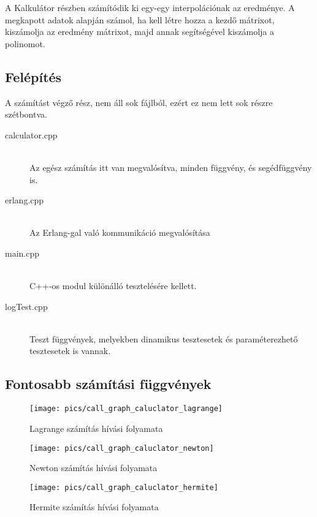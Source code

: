 A Kalkulátor részben számítódik ki egy-egy interpolációnak az eredménye.
A megkapott adatok alapján számol, ha kell létre hozza a kezdő mátrixot, kiszámolja az eredmény mátrixot, majd annak segítségével kiszámolja a polinomot. \newline

\subsection{Felépítés}
	A számítást végző rész, nem áll sok fájlból, ezért ez nem lett sok részre szétbontva. 
	\begin{description}
		\item[calculator.cpp] 
		\hfill \\ Az egész számítás itt van megvalósítva, minden függvény, és segédfüggvény is.
		\item[erlang.cpp] 
		\hfill \\ Az Erlang-gal való kommunikáció megvalósítása
		\item[main.cpp] 
		\hfill \\ C++-os modul különálló tesztelésére kellett.
		\item[logTest.cpp] 
		\hfill \\ 
		Teszt függvények, melyekben dinamikus tesztesetek és paraméterezhető tesztesetek is vannak.
	\end{description}
\subsection{Fontosabb számítási függvények}
	\begin{figure}[h]
		\texttt{[image: pics/call\_graph\_caluclator\_lagrange]}
		\centering
		\caption{Lagrange számítás hívási folyamata\label{fig:call_graph_caluclator_lagrange}}
	\end{figure}

	\begin{figure}[h]
		\texttt{[image: pics/call\_graph\_caluclator\_newton]}
		\centering
		\caption{Newton számítás hívási folyamata\label{fig:call_graph_caluclator_newton}}
	\end{figure}

	\begin{figure}[h]
		\texttt{[image: pics/call\_graph\_caluclator\_hermite]}
		\centering
		\caption{Hermite számítás hívási folyamata\label{fig:call_graph_caluclator_hermite}}
	\end{figure}

